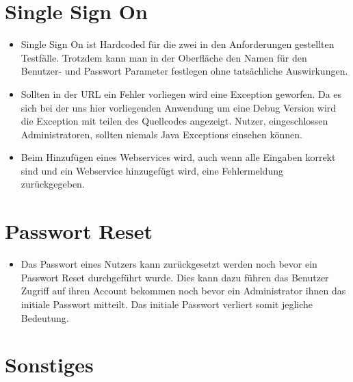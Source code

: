 \documentclass[12pt,DIV14,BCOR10mm,a4paper,parskip=half-,headsepline,headinclude,english,ngerman,bibliography=totocnumbered]{scrreprt}
\begin{document}
\section{Single Sign On}
\begin{itemize}
 \item Single Sign On ist Hardcoded für die zwei in den Anforderungen gestellten Testfälle. Trotzdem kann man in der Oberfläche den Namen für den Benutzer- und Passwort Parameter festlegen ohne tatsächliche Auswirkungen.
  \item Sollten in der URL ein Fehler vorliegen wird eine Exception geworfen. Da es sich bei der uns hier vorliegenden Anwendung um eine Debug Version wird die Exception mit teilen des Quellcodes angezeigt. Nutzer, eingeschlossen Administratoren, sollten niemals Java Exceptions einsehen können.
  \item Beim Hinzufügen eines Webservices wird, auch wenn alle Eingaben korrekt sind und ein Webservice hinzugefügt wird, eine Fehlermeldung zurückgegeben.
 \end{itemize}
 
 \section{Passwort Reset}
\begin{itemize}
 \item Das Passwort eines Nutzers kann zurückgesetzt werden noch bevor ein Passwort Reset durchgeführt wurde. Dies kann dazu führen das Benutzer Zugriff auf ihren Account bekommen noch bevor ein Administrator ihnen das initiale Passwort mitteilt. Das initiale Passwort verliert somit jegliche Bedeutung.
 \end{itemize}

\section{Sonstiges}
\end{document}

